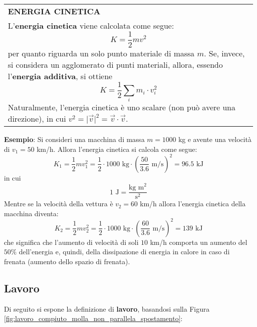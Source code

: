\documentclass[a4paper]{extarticle}
\renewcommand\arraystretch{}
\begin{document}
\vspace{1em}
\setlength{\tabcolsep}{14pt}
\renewcommand{\arraystretch}{2}
\noindent
\begin{tabularx}{\textwidth}{@{}|P|@{}}
    \hline
    {\textbf{ENERGIA CINETICA}}\\
    \parbox{\linewidth}{L'\textbf{energia cinetica} viene calcolata come segue:
    \[\boxed{K=\frac{1}{2}mv^2}\]
    per quanto riguarda un solo punto materiale di massa $m$. Se, invece, si considera un agglomerato di punti materiali, allora, essendo l'\textbf{energia additiva}, si ottiene
    \[\boxed{K=\frac{1}{2} \sum_{i} m_i \cdot v_i^2}\]
    Naturalmente, l'energia cinetica è uno scalare (non può avere una direzione), in cui $v^2=\vert \vec v \vert^2 = \vec v \cdot \vec v $.\vspace{3mm}}\\
    \hline
\end{tabularx}

\vspace{2em}
\noindent
\textbf{Esempio}: Si consideri una macchina di massa $m=1000$ kg e avente una velocità di $v_1=50$ km/h. Allora l'energia cinetica si calcola come segue:
\[K_1=\frac{1}{2}m v_1^2 = \frac{1}{2} \cdot 1000 \text{ kg} \cdot \left( \frac{50}{3.6} \text{ m/s} \right)^2 = 96.5 \text{ kJ}\]
in cui
\[\boxed{1 \text{ J} = \frac{\text{kg m}^2}{\text{s}^2}}\]
Mentre se la velocità della vettura è $v_2=60$ km/h allora l'energia cinetica della macchina diventa:
\[K_2=\frac{1}{2}m v_2^2 = \frac{1}{2} \cdot 1000 \text{ kg} \cdot \left( \frac{60}{3.6} \text{ m/s} \right)^2 = 139 \text{ kJ}\]
che significa che l'aumento di velocità di soli $10$ km/h comporta un aumento del $50\%$ dell'energia e, quindi, della dissipazione di energia in calore in caso di frenata (aumento dello spazio di frenata).

\newpage
\noindent
\subsection{Lavoro}
Di seguito si espone la definizione di \textbf{lavoro}, basandosi sulla Figura \ref{fig:lavoro_compiuto_molla_non_parallela_spostamento}:
\end{document}
